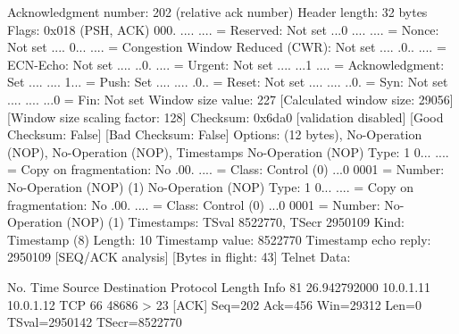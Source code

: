     Acknowledgment number: 202    (relative ack number)
    Header length: 32 bytes
    Flags: 0x018 (PSH, ACK)
        000. .... .... = Reserved: Not set
        ...0 .... .... = Nonce: Not set
        .... 0... .... = Congestion Window Reduced (CWR): Not set
        .... .0.. .... = ECN-Echo: Not set
        .... ..0. .... = Urgent: Not set
        .... ...1 .... = Acknowledgment: Set
        .... .... 1... = Push: Set
        .... .... .0.. = Reset: Not set
        .... .... ..0. = Syn: Not set
        .... .... ...0 = Fin: Not set
    Window size value: 227
    [Calculated window size: 29056]
    [Window size scaling factor: 128]
    Checksum: 0x6da0 [validation disabled]
        [Good Checksum: False]
        [Bad Checksum: False]
    Options: (12 bytes), No-Operation (NOP), No-Operation (NOP), Timestamps
        No-Operation (NOP)
            Type: 1
                0... .... = Copy on fragmentation: No
                .00. .... = Class: Control (0)
                ...0 0001 = Number: No-Operation (NOP) (1)
        No-Operation (NOP)
            Type: 1
                0... .... = Copy on fragmentation: No
                .00. .... = Class: Control (0)
                ...0 0001 = Number: No-Operation (NOP) (1)
        Timestamps: TSval 8522770, TSecr 2950109
            Kind: Timestamp (8)
            Length: 10
            Timestamp value: 8522770
            Timestamp echo reply: 2950109
    [SEQ/ACK analysis]
        [Bytes in flight: 43]
Telnet
    Data: 

No.     Time           Source                Destination           Protocol Length Info
     81 26.942792000   10.0.1.11             10.0.1.12             TCP      66     48686 > 23 [ACK] Seq=202 Ack=456 Win=29312 Len=0 TSval=2950142 TSecr=8522770

